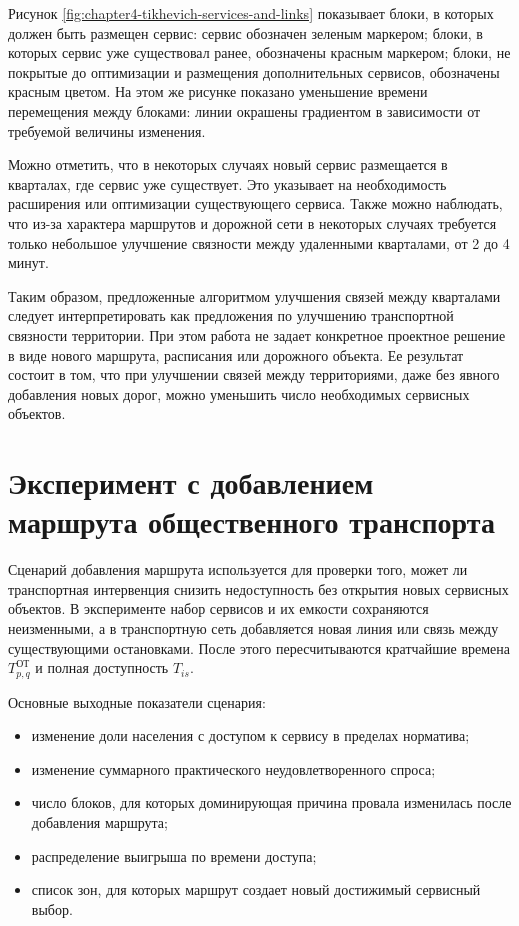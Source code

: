 Рисунок \ref{fig:chapter4-tikhevich-services-and-links} показывает блоки, в которых должен быть размещен сервис: сервис обозначен зеленым маркером; блоки, в которых сервис уже существовал ранее, обозначены красным маркером; блоки, не покрытые до оптимизации и размещения дополнительных сервисов, обозначены красным цветом. На этом же рисунке показано уменьшение времени перемещения между блоками: линии окрашены градиентом в зависимости от требуемой величины изменения.

Можно отметить, что в некоторых случаях новый сервис размещается в кварталах, где сервис уже существует. Это указывает на необходимость расширения или оптимизации существующего сервиса. Также можно наблюдать, что из-за характера маршрутов и дорожной сети в некоторых случаях требуется только небольшое улучшение связности между удаленными кварталами, от 2 до 4 минут.

Таким образом, предложенные алгоритмом улучшения связей между кварталами следует интерпретировать как предложения по улучшению транспортной связности территории. При этом работа не задает конкретное проектное решение в виде нового маршрута, расписания или дорожного объекта. Ее результат состоит в том, что при улучшении связей между территориями, даже без явного добавления новых дорог, можно уменьшить число необходимых сервисных объектов.

\section{Эксперимент с добавлением маршрута общественного транспорта}
\label{sec:add-route-experiment}

Сценарий добавления маршрута используется для проверки того, может ли транспортная интервенция снизить недоступность без открытия новых сервисных объектов. В эксперименте набор сервисов и их емкости сохраняются неизменными, а в транспортную сеть добавляется новая линия или связь между существующими остановками. После этого пересчитываются кратчайшие времена $T^{\text{ОТ}}_{p,q}$ и полная доступность $T_{is}$.

Основные выходные показатели сценария:
\begin{itemize}
    \item изменение доли населения с доступом к сервису в пределах норматива;
    \item изменение суммарного практического неудовлетворенного спроса;
    \item число блоков, для которых доминирующая причина провала изменилась после добавления маршрута;
    \item распределение выигрыша по времени доступа;
    \item список зон, для которых маршрут создает новый достижимый сервисный выбор.
\end{itemize}





